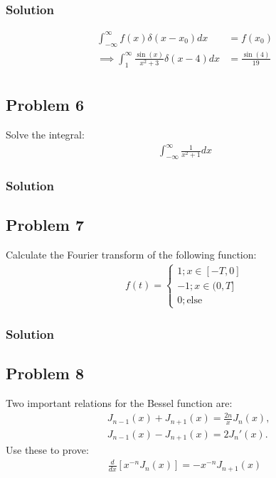 \subsubsection*{Solution}
\begin{align*}
    \int_{-\infty}^{\infty}f(x)\delta(x - x_0)dx &= f(x_0)\\
    \implies \int_{1}^{\infty}\frac{\sin(x)}{x^2 + 3}\delta(x - 4)dx &= \frac{\sin(4)}{19}\\
\end{align*}

\subsection*{Problem 6}
Solve the integral:
\begin{align*}
    \int_{-\infty}^\infty \frac{1}{x^2 + 1}dx
\end{align*}

\subsubsection*{Solution}

\subsection*{Problem 7}
Calculate the Fourier transform of the following function:
\begin{align*}
    f(t) =\begin{cases}
        1; x\in[-T, 0]\\
        -1; x\in(0,T]\\
        0; \text{else}
    \end{cases}
\end{align*}

\subsubsection*{Solution}

\subsection*{Problem 8}
Two important relations for the Bessel function are:
\begin{align*}
    &J_{n-1}(x) + J_{n+1}(x) = \frac{2n}{x}J_n(x),\\
    &J_{n-1}(x) - J_{n+1}(x) = 2J_n'(x).
\end{align*}Use these to prove:
\begin{align*}
    \frac{d}{dx}\left[x^{-n}J_n(x)\right] = -x^{-n}J_{n + 1}(x)
\end{align*}

